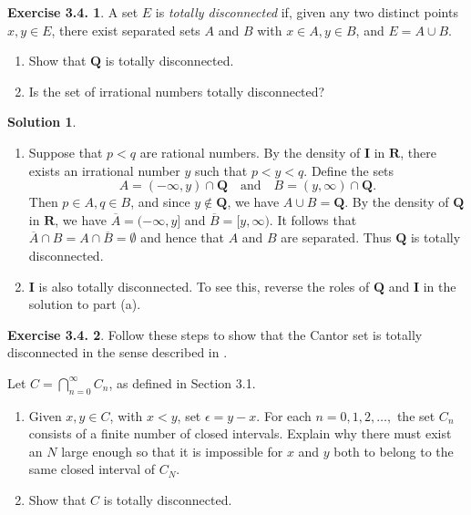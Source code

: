 \documentclass[12pt]{article}
\theoremstyle{definition}
\theoremstyle{exercise}
\newtheorem{exercise}{Exercise 3.4.}
\theoremstyle{solution}
\newtheorem*{solution}{Solution}
\newcommand{\quand}{\quad \text{and} \quad}
\newcommand{\Q}{\mathbf{Q}}
\newcommand{\I}{\mathbf{I}}
\newcommand{\R}{\mathbf{R}}
\begin{document}
\begin{exercise}
\label{ex:7}
    A set \( E \) is \textit{totally disconnected} if, given any two distinct points \( x, y \in E \), there exist separated sets \( A \) and \( B \) with \( x \in A, y \in B \), and \( E = A \cup B \).
    \begin{enumerate}
        \item Show that \( \Q \) is totally disconnected.
        
        \item Is the set of irrational numbers totally disconnected?
    \end{enumerate}
\end{exercise}

\begin{solution}
    \begin{enumerate}
        \item Suppose that \( p < q \) are rational numbers. By the density of \( \I \) in \( \R \), there exists an irrational number \( y \) such that \( p < y < q \). Define the sets
        \[
            A = (-\infty, y) \cap \Q \quand B = (y, \infty) \cap \Q.
        \]
        Then \( p \in A, q \in B \), and since \( y \not\in \Q \), we have \( A \cup B = \Q \). By the density of \( \Q \) in \( \R \), we have \( \overline{A} = (-\infty, y] \) and \( \overline{B} = [y, \infty) \). It follows that \( \overline{A} \cap B = A \cap \overline{B} = \emptyset \) and hence that \( A \) and \( B \) are separated. Thus \( \Q \) is totally disconnected.

        \item \( \I \) is also totally disconnected. To see this, reverse the roles of \( \Q \) and \( \I \) in the solution to part (a).
    \end{enumerate}
\end{solution}

\begin{exercise}
\label{ex:8}
    Follow these steps to show that the Cantor set is totally disconnected in the sense described in .

    Let \( C = \bigcap_{n=0}^{\infty} C_n \), as defined in Section 3.1.
    \begin{enumerate}
        \item Given \( x, y \in C \), with \( x < y \), set \( \epsilon = y - x \). For each \( n = 0, 1, 2, \ldots, \) the set \( C_n \) consists of a finite number of closed intervals. Explain why there must exist an \( N \) large enough so that it is impossible for \( x \) and \( y \) both to belong to the same closed interval of \( C_N \).

        \item Show that \( C \) is totally disconnected.
    \end{enumerate}
\end{exercise}
\end{document}
